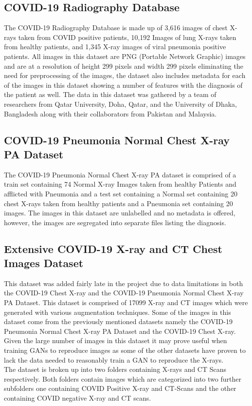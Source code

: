 \subsection{COVID-19 Radiography Database}
The COVID-19 Radiography Database is made up of 3,616 images of chest X-rays taken from COVID positive patients, 10,192 Images of lung X-rays taken from healthy patients, and 1,345 X-ray images of viral pneumonia positive patients. All images in this dataset are PNG (Portable Network Graphic) images and are at a resolution of height 299 pixels and width 299 pixels eliminating the need for preprocessing of the images, the dataset also includes metadata for each of the images in this dataset showing a number of features with the diagnosis of the patient as well. The data in this dataset was gathered by a team of researchers from Qatar University, Doha, Qatar, and the University of Dhaka, Bangladesh along with their collaborators from Pakistan and Malaysia\cite{radiography}.
\\
\subsection{COVID-19 Pneumonia Normal Chest X-ray PA Dataset}
The COVID-19 Pneumonia Normal Chest X-ray PA dataset is comprised of a train set containing 74 Normal X-ray Images taken from healthy Patients and  afflicted with Pneumonia and a test set containing a Normal set containing 20 chest X-rays taken from healthy patients and a Pneumonia set containing 20 images.  The images in this dataset are unlabelled and no metadata is offered, however, the images are segregated into separate files listing the diagnosis\cite{covidDataset}.
\\
\subsection{Extensive COVID-19 X-ray and CT Chest Images Dataset}
This dataset was added fairly late in the project due to data limitations in both the COVID-19 Chest X-ray and the COVID-19 Pneumonia Normal Chest X-ray PA Dataset.  This dataset is comprised of 17099 X-ray and CT images which were generated with various augmentation techniques.  Some of the images in this dataset come from the previously mentioned datasets namely the COVID-19 Pneumonia Normal Chest X-ray PA Dataset and the COVID-19 Chest X-ray.  Given the large number of images in this dataset it may prove useful when training GANs to reproduce images as some of the other datasets have proven to lack the data needed to reasonably train a GAN to reproduce the X-rays.
\\
The dataset is broken up into two folders containing X-rays and CT Scans respectively. Both folders contain images which are categorized into two further subfolders 
one containing COVID Positive X-ray and CT-Scans and the other containing COVID negative X-ray and CT scans\cite{extendedCOVIDds}.
\\
